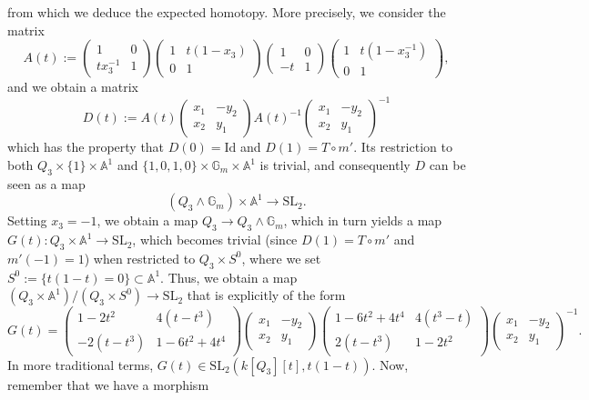 \documentclass[11pt,leqno]{article}
\newcommand{\A}{{\mathbb A}}
\renewcommand{\1}{{\rm 1\hspace*{-0.4ex}%
\rule{0.1ex}{1.52ex}\hspace*{0.2ex}}}
\newcommand{\gm}{{{\mathbb G}_{m}}}
\newcommand{\<}[1]{{\langle}#1 {\rangle}}
\theoremstyle{plain}
\theoremstyle{definition}
\theoremstyle{remark}
\numberwithin{equation}{section}
\begin{document}
from which we deduce the expected homotopy. More precisely, we consider the matrix
\[
A(t):=\begin{pmatrix} 1 & 0 \\ tx_3^{-1} & 1\end{pmatrix}\begin{pmatrix} 1 & t(1-x_3)  \\ 0 & 1\end{pmatrix}\begin{pmatrix} 1 & 0 \\ -t & 1\end{pmatrix}\begin{pmatrix} 1 & t(1-x_3^{-1})  \\ 0 & 1\end{pmatrix}, 
\]
and we obtain a matrix
\[
D(t):=A(t)\begin{pmatrix} x_1 & -y_2 \\ x_2 & y_1\end{pmatrix}A(t)^{-1}\begin{pmatrix} x_1 & -y_2 \\ x_2 & y_1\end{pmatrix}^{-1}
\]
which has the property that $D(0)=\mathrm{Id}$ and $D(1)=T\circ m'$. Its restriction to both $Q_3\times \{1\}\times \A^1$ and $\{1,0,1,0\}\times \gm{}\times \A^1$ is trivial, and consequently $D$ can be seen as a map 
\[
(Q_3\wedge \gm{})\times \A^1\to \mathrm{SL}_2.
\] 
Setting $x_3=-1$, we obtain a map $Q_3\to Q_3\wedge \gm{}$, which in turn yields a map $G(t)\colon Q_3\times \A^1\to \mathrm{SL}_2$, which becomes trivial (since $D(1)=T\circ m'$ and $m'(-1)=1$) when restricted to $Q_3\times S^0$, where we set $S^0:=\{t(1-t)=0\}\subset \A^1$. Thus, we obtain a map $(Q_3\times\A^1)/(Q_3\times S^0)\to \mathrm{SL}_2$ that is explicitly of the form
\[
G(t)  =  \begin{pmatrix} 1-2t^2 & 4(t-t^3) \\ -2(t-t^3) & 1-6t^2+4t^4 \end{pmatrix}\begin{pmatrix} x_1 & -y_2 \\ x_2 & y_1\end{pmatrix}\begin{pmatrix} 1-6t^2+4t^4 & 4(t^3-t) \\ 2(t-t^3) & 1-2t^2 \end{pmatrix}\begin{pmatrix} x_1 & -y_2 \\ x_2 & y_1 \end{pmatrix}^{-1}. 
\]
In more traditional terms, $G(t)\in \mathrm{SL}_2(k[Q_3][t],t(1-t))$. Now, remember that we have a morphism
\end{document}
